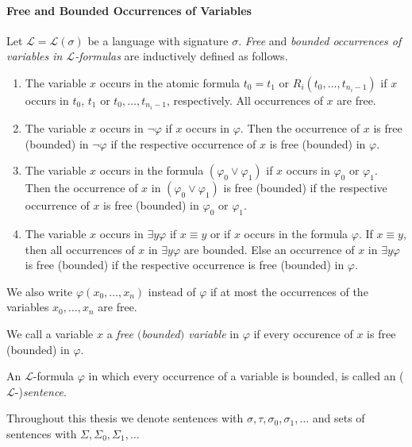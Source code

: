\paragraph{Free and Bounded Occurrences of Variables}
Let $\mathcal{L}=\mathcal{L}(\sigma)$ be a language with signature $\sigma $. \textit{Free} and \textit{bounded occurrences of variables in $\mathcal{L}$-formulas} are inductively defined as follows.
\begin{enumerate}
\item The variable $x$ occurs in the atomic formula $t_0 = t_1$ or $R_i(t_0, \ldots, t_{n_i-1})$ if $x$ occurs in $t_0$, $t_1$ or $t_0, \ldots, t_{n_i-1}$, respectively. All occurrences of  $x$ are free.
\item The variable $x$ occurs in $\lnot \varphi$ if $x$ occurs in $\varphi$. Then the occurrence of $x$ is  free (bounded) in $\lnot \varphi$ if the respective occurrence of $x$ is free (bounded) in $\varphi$. 
\item The variable $x$ occurs in the formula $(\varphi_0 \vee \varphi_1 )$ if $x$ occurs in $\varphi_0$ or $\varphi_1$. Then the occurrence of $x$ in $(\varphi_0 \vee \varphi_1)$ is free (bounded) if the respective occurrence of $x$ is free (bounded) in $\varphi_0$ or $\varphi_1$. 
\item The variable $x$ occurs in $\exists y \varphi$ if $x \equiv y$ or if $x$ occurs in the formula $\varphi$. If $x \equiv y$, then all occurrences of $x$ in $\exists y \varphi$ are bounded. Else an occurrence of $x$ in $\exists y \varphi$ is free (bounded) if the respective occurrence is free (bounded) in $\varphi$.
\end{enumerate}

We also write $\varphi(x_0, \ldots, x_n)$ instead of $\varphi$ if at most the occurrences of the variables $x_0, \ldots, x_n$ are free. 

We call a variable $x$ a \textit{free $($bounded$)$ variable} in $\varphi$ if every occurence of $x$ is free (bounded) in $\varphi$.

An $\mathcal{L}$-formula $\varphi$ in which every occurrence of a variable is bounded, is called an ($\mathcal{L}$-)\textit{sentence}.

Throughout this thesis we denote sentences with $\sigma, \tau, \sigma_0, \sigma_1,  \ldots$ and sets of sentences with $\Sigma, \Sigma_0, \Sigma_1, \ldots$

